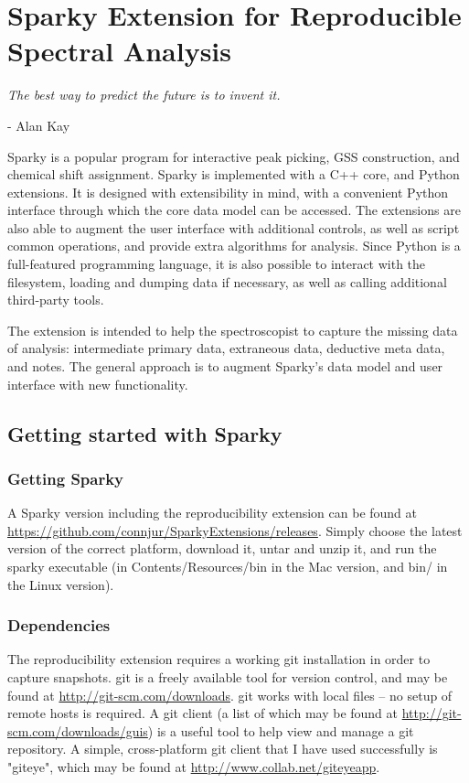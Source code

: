 \chapter{Sparky Extension for Reproducible Spectral Analysis}
\label{sec_sparky_extension}

\begin{center}
  \textit{The best way to predict the future is to invent it.}

 - Alan Kay
\end{center}


Sparky \cite{sparky} is a popular program for interactive peak picking,
GSS construction, and chemical shift assignment.  Sparky is implemented 
with a C++ core, and Python extensions.  It is designed with
extensibility in mind, with a convenient Python interface through which 
the core data model can be accessed.  The
extensions are also able to augment the user interface with additional
controls, as well as script common operations, and provide extra algorithms
for analysis.  Since Python is a full-featured programming language, 
it is also possible to interact with the filesystem, loading and dumping
data if necessary, as well as calling additional third-party tools.

The extension is intended to help the spectroscopist to capture the 
missing data of analysis: intermediate primary data, extraneous
data, deductive meta data, and notes.  The general approach is to augment
Sparky's data model and user interface with new functionality.



\section{Getting started with Sparky}

\subsection*{Getting Sparky}
A Sparky version including the reproducibility extension can be found at
\url{https://github.com/connjur/SparkyExtensions/releases}.  Simply 
choose the latest version of the correct platform, download it, untar and 
unzip it, and run the sparky executable (in Contents/Resources/bin in the
Mac version, and bin/ in the Linux version).

\subsection*{Dependencies}
The reproducibility extension requires a working git installation in order
to capture snapshots.  git is a freely available tool for version control,
and may be found at \url{http://git-scm.com/downloads}.
git works with local files -- no setup of remote hosts is required.
A git client (a list of which may be found at \url{http://git-scm.com/downloads/guis})
is a useful tool to help view and manage a git repository.  A simple,
cross-platform git client that I have used successfully is "giteye",
which may be found at \url{http://www.collab.net/giteyeapp}.

